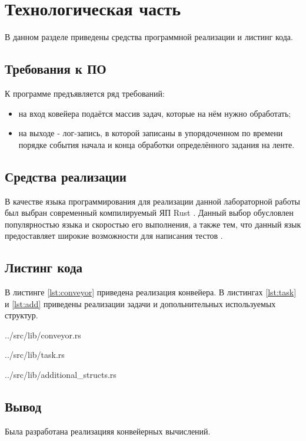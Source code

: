 \chapter{Технологическая часть}

В данном разделе приведены средства программной реализации и листинг кода.

\section{Требования к ПО}

К программе предъявляется ряд требований:
\begin{itemize}
    \item на вход ковейера подаётся массив задач, которые на нём нужно обработать;
	\item на выходе - лог-запись, в которой записаны в упорядоченном по времени порядке события начала и конца обработки определённого задания на ленте.
\end{itemize}

\section{Средства реализации}

В качестве языка программирования для реализации данной лабораторной работы был выбран современный компилируемый ЯП Rust \cite{rustlang}. Данный выбор обусловлен популярностью языка и скоростью его выполнения, а также тем, что данный язык предоставляет широкие возможности для написания тестов \cite{rusttest}.

\section{Листинг кода}

В листинге \ref{lst:conveyor} приведена реализация конвейера. В листингах \ref{lst:task} и \ref{lst:add} приведены реализации задачи и допольнительных используемых структур.

\begin{lstinputlisting}[
	caption={Реализация конвейера},
	label={lst:conveyor},
	style={rust}
]{../src/lib/conveyor.rs}
\end{lstinputlisting}

\begin{lstinputlisting}[
	caption={Структура задачи},
	label={lst:task},
	style={rust},
    linerange={1-152}
]{../src/lib/task.rs}
\end{lstinputlisting}

\begin{lstinputlisting}[
	caption={Дополнительные структуры},
	label={lst:add},
	style={rust}
]{../src/lib/additional_structs.rs}
\end{lstinputlisting}


\section*{Вывод}

Была разработана реализацияя конвейерных вычислений.
